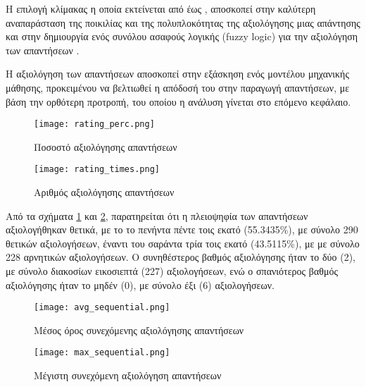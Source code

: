 Η επιλογή κλίμακας η οποία εκτείνεται από  έως
, αποσκοπεί στην καλύτερη αναπαράσταση της ποικιλίας και
της πολυπλοκότητας της αξιολόγησης μιας απάντησης και στην δημιουργία
ενός συνόλου ασαφούς λογικής (\textlatin{fuzzy logic}) για την
αξιολόγηση των απαντήσεων
\cite{ZADEH1965338,klir1995fuzzy,ross2010fuzzy}.

Η αξιολόγηση των απαντήσεων αποσκοπεί στην εξάσκηση ενός μοντέλου
μηχανικής μάθησης, προκειμένου να βελτιωθεί η απόδοσή του στην παραγωγή
απαντήσεων, με βάση την ορθότερη προτροπή, του οποίου η ανάλυση γίνεται
στο επόμενο κεφάλαιο.

\begin{figure}[H]
  \begin{center}
    \texttt{[image: rating\_perc.png]}
    \caption{Ποσοστό αξιολόγησης απαντήσεων}
    \label{fig:RatingPerc}
  \end{center}
\end{figure}

\begin{figure}[H]
  \begin{center}
    \texttt{[image: rating\_times.png]}
    \caption{Αριθμός αξιολόγησης απαντήσεων}
  \label{fig:RatingTimes}
  \end{center}
\end{figure}

Από τα σχήματα \ref{fig:RatingPerc} και \ref{fig:RatingTimes},
παρατηρείται ότι η πλειοψηφία των απαντήσεων αξιολογήθηκαν θετικά, με το
το πενήντα πέντε τοις εκατό (55.3435\%), με σύνολο 290 θετικών
αξιολογήσεων, έναντι του σαράντα τρία τοις εκατό (43.5115\%), με με
σύνολο 228 αρνητικών αξιολογήσεων. Ο συνηθέστερος βαθμός αξιολόγησης
ήταν το δύο (2), με σύνολο διακοσίων εικοσιεπτά (227) αξιολογήσεων, ενώ
ο σπανιότερος βαθμός αξιολόγησης ήταν το μηδέν (0), με σύνολο έξι (6)
αξιολογήσεων.

\begin{figure}[H]
  \begin{center}
    \texttt{[image: avg\_sequential.png]}
    \caption{Μέσος όρος συνεχόμενης αξιολόγησης απαντήσεων}
  \end{center}
  \label{fig:AverageSequential}
\end{figure}

\begin{figure}[H]
  \centering
  \texttt{[image: max\_sequential.png]}
  \caption{Μέγιστη συνεχόμενη αξιολόγηση απαντήσεων}
  \label{fig:MaxSequential}
\end{figure}

